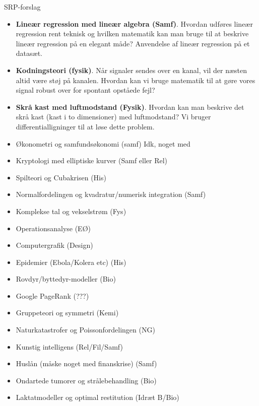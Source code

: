 \documentclass[12pt]{article}
\begin{document}



\begin{center}
	\Huge
	SRP-forslag
\end{center}
\def\labelitemi{$\cdot$}
\begin{itemize}
	\item \textbf{Lineær regression med lineær algebra (Samf)}.
	Hvordan udføres lineær regression rent teknisk og hvilken matematik kan man bruge til at 
	beskrive lineær regression på en elegant måde? Anvendelse af lineær regression på et 
	datasæt.
	\item \textbf{Kodningsteori (fysik)}.
	Når signaler sendes over en kanal, vil der næsten altid være støj på kanalen. Hvordan kan 
	vi bruge matematik til at gøre vores signal robust over for spontant opståede fejl?
	\item \textbf{Skrå kast med luftmodstand (Fysik)}.
	Hvordan kan man beskrive det skrå kast (kast i to dimensioner) med luftmodstand? Vi bruger 
	differentialligninger til at løse dette problem.
	\item Økonometri og samfundsøkonomi (samf)
	Idk, noget med 
	\item Kryptologi med elliptiske kurver (Samf eller Rel)
	\item Spilteori og Cubakrisen (His)
	\item Normalfordelingen og kvadratur/numerisk integration (Samf)
	\item Komplekse tal og vekselstrøm (Fys)
	\item Operationsanalyse (EØ)
	\item Computergrafik (Design)
	\item Epidemier (Ebola/Kolera etc) (His)
	\item Rovdyr/byttedyr-modeller (Bio)
	\item Google PageRank (???)
	\item Gruppeteori og symmetri (Kemi)
	\item Naturkatastrofer og Poissonfordelingen (NG)
	\item Kunstig intelligens (Rel/Fil/Samf)
	\item Huslån (måske noget med finanskrise) (Samf)
	\item Ondartede tumorer og strålebehandling (Bio)
	\item Laktatmodeller og optimal restitution (Idræt B/Bio)
\end{itemize}
\end{document}
